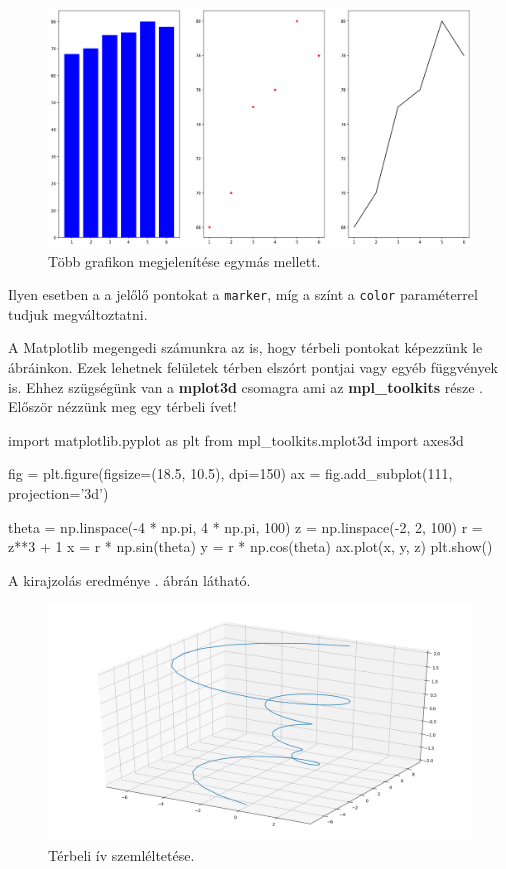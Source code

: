 \begin{figure}[h!]
\centering
\includegraphics[width=\textwidth]{img/multi-plot.png}
\caption{Több grafikon megjelenítése egymás mellett.}
\label{fig:multi-plot}
\end{figure}
    
    Ilyen esetben a a jelőlő pontokat a \texttt{marker}, míg a színt a \texttt{color} paraméterrel tudjuk megváltoztatni.
    

    A Matplotlib megengedi számunkra az is, hogy térbeli pontokat képezzünk le ábráinkon. Ezek lehetnek felületek  térben elszórt pontjai vagy egyéb függvények is. Ehhez szügségünk van a \textbf{mplot3d} csomagra
ami az \textbf{mpl\_toolkits} része \cite{datascience}.
Először nézzünk meg egy térbeli ívet!
\begin{python}
import matplotlib.pyplot as plt
from mpl_toolkits.mplot3d import axes3d

fig = plt.figure(figsize=(18.5, 10.5), dpi=150)
ax = fig.add_subplot(111, projection='3d')

theta = np.linspace(-4 * np.pi, 4 * np.pi, 100)
z = np.linspace(-2, 2, 100)
r = z**3 + 1
x = r * np.sin(theta)
y = r * np.cos(theta)
ax.plot(x, y, z)
plt.show()
\end{python}
A kirajzolás eredménye . ábrán látható.

\begin{figure}[h!]
\centering
\includegraphics[width=\textwidth]{img/curve-1.png}
\caption{Térbeli ív szemléltetése.}
\label{fig:curve-1}
\end{figure}

